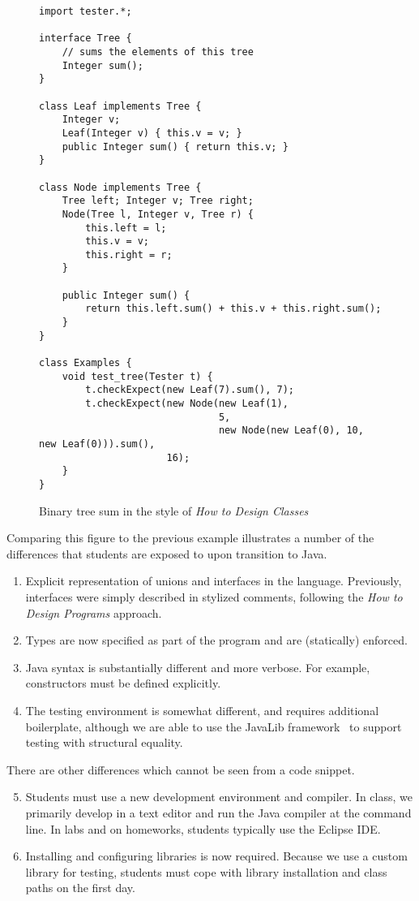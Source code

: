 \documentclass[submission,copyright]{eptcs}
\def\htdp{\emph{How to Design Programs}\xspace}
\begin{document}
\begin{figure}
\begin{verbatim}
import tester.*;

interface Tree {
    // sums the elements of this tree
    Integer sum();
}

class Leaf implements Tree {
    Integer v;
    Leaf(Integer v) { this.v = v; }
    public Integer sum() { return this.v; }
}

class Node implements Tree {
    Tree left; Integer v; Tree right;
    Node(Tree l, Integer v, Tree r) {
        this.left = l;
        this.v = v;
        this.right = r;
    }

    public Integer sum() {
        return this.left.sum() + this.v + this.right.sum();
    }
}

class Examples {
    void test_tree(Tester t) {
        t.checkExpect(new Leaf(7).sum(), 7);
        t.checkExpect(new Node(new Leaf(1),
                               5, 
                               new Node(new Leaf(0), 10, new Leaf(0))).sum(),
                      16);
    }
}
\end{verbatim}
\caption{Binary tree sum in the style of \emph{How to Design Classes}}
\label{fig:java}
\end{figure}

Comparing this figure to the previous example illustrates a number of the
differences that students are exposed to upon transition to Java.

\begin{enumerate}
\item Explicit representation of unions and interfaces in the
  language.  Previously, interfaces were simply described in stylized
  comments, following the \htdp approach.
\item Types are now specified as part of the program and are (statically)
  enforced.
\item Java syntax is substantially different and more verbose. For
  example, constructors must be defined explicitly.
\item The testing environment is somewhat different, and requires
  additional boilerplate, although we are
  able to use the JavaLib framework~\cite{local:java-world} to support testing with
  structural equality.
\end{enumerate}

\noindent
There are other differences which cannot be seen from a code snippet.

\begin{enumerate}
  \setcounter{enumi}{4}
\item Students must use a new development environment and compiler.
  In class, we primarily develop in a text editor and run the Java
  compiler at the command line.  In labs and on homeworks, students
  typically use the Eclipse IDE.
\item Installing and configuring libraries is now required.  Because
  we use a custom library for testing, students must cope with library
  installation and class paths on the first day.
\end{enumerate}
\end{document}
